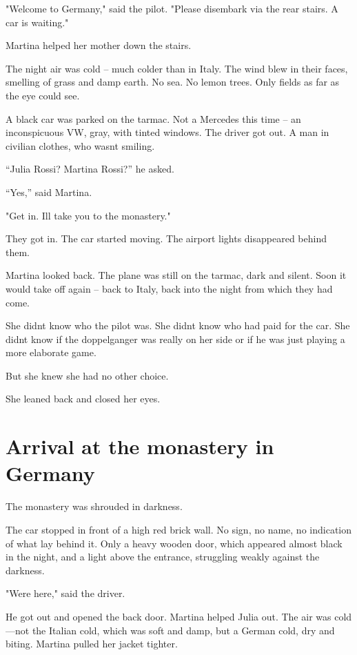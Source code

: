 \documentclass[
]{article}
\begin{document}
"Welcome to Germany," said the pilot. "Please disembark via the rear stairs. A car is waiting."

Martina helped her mother down the stairs.

The night air was cold -- much colder than in Italy. The wind blew in their faces, smelling of grass and damp earth. No sea. No lemon trees. Only fields as far as the eye could see.

A black car was parked on the tarmac. Not a Mercedes this time -- an inconspicuous VW, gray, with tinted windows. The driver got out. A man in civilian clothes, who wasn\textquotesingle t smiling.

``Julia Rossi? Martina Rossi?'' he asked.

``Yes,'' said Martina.

"Get in. I\textquotesingle ll take you to the monastery."

They got in. The car started moving. The airport lights disappeared behind them.

Martina looked back. The plane was still on the tarmac, dark and silent. Soon it would take off again -- back to Italy, back into the night from which they had come.

She didn\textquotesingle t know who the pilot was. She didn\textquotesingle t know who had paid for the car. She didn\textquotesingle t know if the doppelganger was really on her side or if he was just playing a more elaborate game.

But she knew she had no other choice.

She leaned back and closed her eyes.

\section{Arrival at the monastery in Germany}\label{arrival-at-the-monastery-in-germany}

The monastery was shrouded in darkness.

The car stopped in front of a high red brick wall. No sign, no name, no indication of what lay behind it. Only a heavy wooden door, which appeared almost black in the night, and a light above the entrance, struggling weakly against the darkness.

"We\textquotesingle re here," said the driver.

He got out and opened the back door. Martina helped Julia out. The air was cold---not the Italian cold, which was soft and damp, but a German cold, dry and biting. Martina pulled her jacket tighter.
\end{document}
